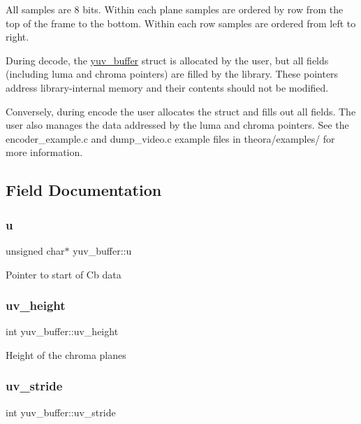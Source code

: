 All samples are 8 bits. Within each plane samples are ordered by row from the top of the frame to the bottom. Within each row samples are ordered from left to right.

During decode, the \hyperlink{structyuv__buffer}{yuv\+\_\+buffer} struct is allocated by the user, but all fields (including luma and chroma pointers) are filled by the library. These pointers address library-\/internal memory and their contents should not be modified.

Conversely, during encode the user allocates the struct and fills out all fields. The user also manages the data addressed by the luma and chroma pointers. See the encoder\+\_\+example.\+c and dump\+\_\+video.\+c example files in theora/examples/ for more information. 

\subsection{Field Documentation}
\mbox{\label{structyuv__buffer_a8b1857afe3ffac28f259499a57a559e1}} 
\subsubsection{\texorpdfstring{u}{u}}
{\footnotesize\ttfamily unsigned char$\ast$ yuv\+\_\+buffer\+::u}

Pointer to start of Cb data \mbox{\label{structyuv__buffer_a640f1a0b456d3807f9f0538b22f10097}} 
\subsubsection{\texorpdfstring{uv\+\_\+height}{uv\_height}}
{\footnotesize\ttfamily int yuv\+\_\+buffer\+::uv\+\_\+height}

Height of the chroma planes \mbox{\label{structyuv__buffer_ab265cc24ffb5650bf52daf223b0debb9}} 
\subsubsection{\texorpdfstring{uv\+\_\+stride}{uv\_stride}}
{\footnotesize\ttfamily int yuv\+\_\+buffer\+::uv\+\_\+stride}

